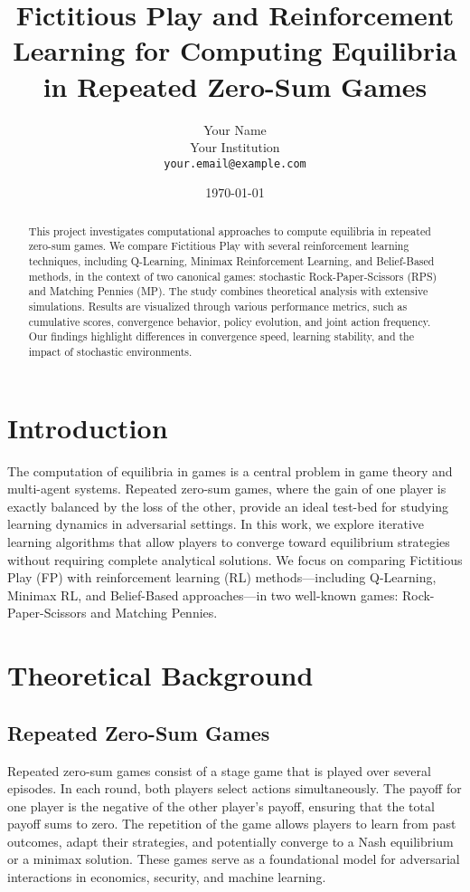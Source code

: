 \documentclass[11pt]{article}
\title{Fictitious Play and Reinforcement Learning for Computing Equilibria in Repeated Zero-Sum Games}
\author{Your Name \\ Your Institution \\ \texttt{your.email@example.com}}
\date{\today}
\begin{document}
\maketitle

\begin{abstract}
This project investigates computational approaches to compute equilibria in repeated zero-sum games. We compare Fictitious Play with several reinforcement learning techniques, including Q-Learning, Minimax Reinforcement Learning, and Belief-Based methods, in the context of two canonical games: stochastic Rock-Paper-Scissors (RPS) and Matching Pennies (MP). The study combines theoretical analysis with extensive simulations. Results are visualized through various performance metrics, such as cumulative scores, convergence behavior, policy evolution, and joint action frequency. Our findings highlight differences in convergence speed, learning stability, and the impact of stochastic environments.
\end{abstract}

\section{Introduction}
The computation of equilibria in games is a central problem in game theory and multi-agent systems. Repeated zero-sum games, where the gain of one player is exactly balanced by the loss of the other, provide an ideal test-bed for studying learning dynamics in adversarial settings. In this work, we explore iterative learning algorithms that allow players to converge toward equilibrium strategies without requiring complete analytical solutions. We focus on comparing Fictitious Play (FP) with reinforcement learning (RL) methods—including Q-Learning, Minimax RL, and Belief-Based approaches—in two well-known games: Rock-Paper-Scissors and Matching Pennies.

\section{Theoretical Background}

\subsection{Repeated Zero-Sum Games}
Repeated zero-sum games consist of a stage game that is played over several episodes. In each round, both players select actions simultaneously. The payoff for one player is the negative of the other player's payoff, ensuring that the total payoff sums to zero. The repetition of the game allows players to learn from past outcomes, adapt their strategies, and potentially converge to a Nash equilibrium or a minimax solution. These games serve as a foundational model for adversarial interactions in economics, security, and machine learning.
\end{document}
